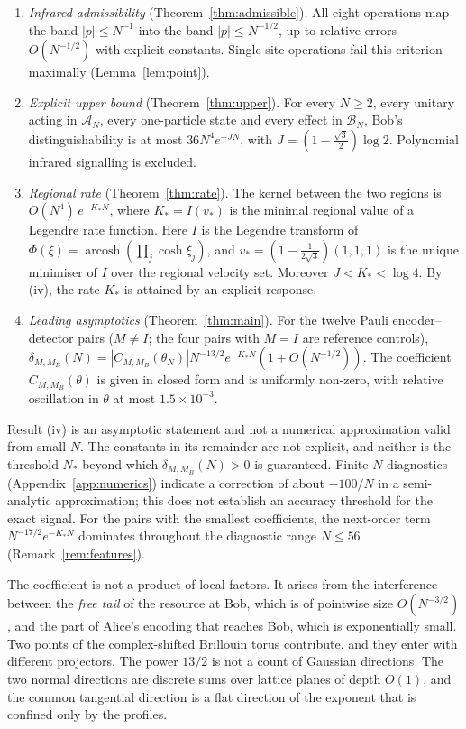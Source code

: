 \documentclass[11pt]{amsart}
\theoremstyle{definition}
\theoremstyle{remark}
\newcommand{\cA}{\mathcal{A}}
\newcommand{\cB}{\mathcal{B}}
\newcommand{\arcosh}{\operatorname{arcosh}}
\begin{document}
\begin{enumerate}[label=(\roman*)]
\item \emph{Infrared admissibility} (Theorem~\ref{thm:admissible}).  All
  eight operations map the band $|p|\le N^{-1}$ into the band
  $|p|\le N^{-1/2}$, up to relative errors $O(N^{-1/2})$ with explicit
  constants.  Single-site operations fail this criterion maximally
  (Lemma~\ref{lem:point}).
\item \emph{Explicit upper bound} (Theorem~\ref{thm:upper}).  For every
  $N\ge2$, every unitary acting in $\cA_N$, every one-particle state and
  every effect in $\cB_N$, Bob's distinguishability is at most
  $36N^4e^{-JN}$, with $J=(1-\tfrac{\sqrt3}{2})\log2$.  Polynomial infrared
  signalling is excluded.
\item \emph{Regional rate} (Theorem~\ref{thm:rate}).  The kernel between
  the two regions is $O(N^4)\,e^{-K_*N}$, where $K_*=I(v_*)$ is the minimal
  regional value of a Legendre rate function.  Here $I$ is the Legendre
  transform of $\Phi(\xi)=\arcosh(\prod_j\cosh\xi_j)$, and
  $v_*=(1-\frac1{2\sqrt3})(1,1,1)$ is the unique minimiser of $I$ over the
  regional velocity set.  Moreover $J<K_*<\log4$.  By (iv), the rate $K_*$
  is attained by an explicit response.
\item \emph{Leading asymptotics} (Theorem~\ref{thm:main}).  For the twelve
  Pauli encoder--detector pairs ($M\ne I$; the four pairs with $M=I$ are
  reference controls),
  $\delta_{M,M_B}(N)=|C_{M,M_B}(\theta_N)|N^{-13/2}e^{-K_*N}(1+O(N^{-1/2}))$.
  The coefficient $C_{M,M_B}(\theta)$ is given in closed form and is
  uniformly non-zero, with relative oscillation in $\theta$ at most
  $1.5\times10^{-3}$.
\end{enumerate}

Result (iv) is an asymptotic statement and not a numerical approximation
valid from small $N$.  The constants in its remainder are not explicit, and
neither is the threshold $N_*$ beyond which $\delta_{M,M_B}(N)>0$ is
guaranteed.  Finite-$N$ diagnostics (Appendix~\ref{app:numerics}) indicate
a correction of about $-100/N$ in a semi-analytic approximation; this does
not establish an accuracy threshold for the exact signal.  For the pairs with the
smallest coefficients, the next-order term $N^{-17/2}e^{-K_*N}$ dominates
throughout the diagnostic range $N\le56$ (Remark~\ref{rem:features}).

The coefficient is not a product of local factors.  It arises from the
interference between the \emph{free tail} of the resource at Bob, which is
of pointwise size $O(N^{-3/2})$, and the part of Alice's encoding that reaches Bob,
which is exponentially small.  Two points of the complex-shifted Brillouin
torus contribute, and they enter with different projectors.  The power
$13/2$ is not a count of Gaussian directions.  The two normal directions are
discrete sums over lattice planes of depth $O(1)$, and the common tangential
direction is a flat direction of the exponent that is confined only by the
profiles.
\end{document}
